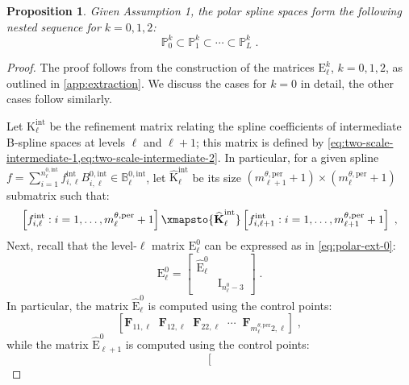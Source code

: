\documentclass[10pt]{article}
\newcommand{\mbf}[1]{{\boldsymbol{#1}}}
\newcommand{\vSpace}[1]{\mathbb{#1}}
\newcommand{\mat}[1]{\mbf{\mathrm{#1}}}
\newcommand{\cU}{\theta}
\newcommand{\bsp}{B}
\newcommand{\bspS}{\vSpace{\bsp}}
\newcommand{\per}{\mathrm{per}}
\newcommand{\pndofU}{m^{\cU,\per}}
\newcommand{\polar}{P}
\newcommand{\polarS}{\vSpace{\polar}}
\newcommand{\tint}{\mathrm{int}}
\theoremstyle{plain}
\newtheorem{proposition}{Proposition}[section]
\theoremstyle{definition}
\theoremstyle{remark}
\begin{document}
\begin{proposition}
    Given Assumption 1, the polar spline spaces form the following nested sequence for $k = 0, 1, 2$:
    \begin{equation}
        \polarS^k_0 \subset \polarS^k_1 \subset \cdots \subset \polarS^k_L\;.
    \end{equation}
\end{proposition}
\begin{proof}
    The proof follows from the construction of the matrices $\mat{E}^{k}_\ell$, $k = 0, 1, 2$, as outlined in \cref{app:extraction}.
    We discuss the cases for $k = 0$ in detail, the other cases follow similarly.

	Let $\mat{K}^{\tint}_\ell$ be the refinement matrix relating the spline coefficients of intermediate B-spline spaces at levels $\ell$ and $\ell+1$; this matrix is defined by \cref{eq:two-scale-intermediate-1,eq:two-scale-intermediate-2}.
    In particular, for a given spline $f = \sum_{i=1}^{n^{0,\tint}_\ell} f_{i,\ell}^\tint \bsp^{0,\tint}_{i,\ell} \in \bspS^{0,\tint}_\ell$, let $\widehat{\mat{K}}^{\tint}_\ell$ be its size $(\pndofU_{\ell+1}+1) \times (\pndofU_\ell+1)$ submatrix such that:
    \begin{equation*}
        \left[
            f^\tint_{i,\ell} : i = 1, \dots, \pndofU_{\ell}+1
        \right]
        \xmapsto{\widehat{\mat{K}}^{\tint}_\ell}
        \left[
            f^\tint_{i,\ell+1} : i = 1, \dots, \pndofU_{\ell+1}+1
        \right]\;,
    \end{equation*}
    Next, recall that the level-$\ell$ matrix $\mat{E}^0_{\ell}$ can be expressed as in \eqref{eq:polar-ext-0}:
    \begin{equation*}
        \mat{E}^0_{\ell} = 
    \begin{bmatrix}
    \widehat{\mat{E}}^0_{\ell} &\\
    & \mat{I}_{n^0_{\ell}-3}
    \end{bmatrix}\;.
    \end{equation*}
    In particular, the matrix $\widehat{\mat{E}}^0_{\ell}$ is computed using the control points:
    \begin{equation*}
        \left[
            \mbf{F}_{11,\ell}\;\;\mbf{F}_{12,\ell}\;\;\mbf{F}_{22,\ell}\;\;\cdots\;\;\mbf{F}_{\pndofU_{\ell}2,\ell}
        \right]\;,
    \end{equation*}
    while the matrix $\widehat{\mat{E}}^0_{\ell+1}$ is computed using the control points:
    \begin{equation*}
        \left[

\end{equation*}
\end{proof}
\end{document}
